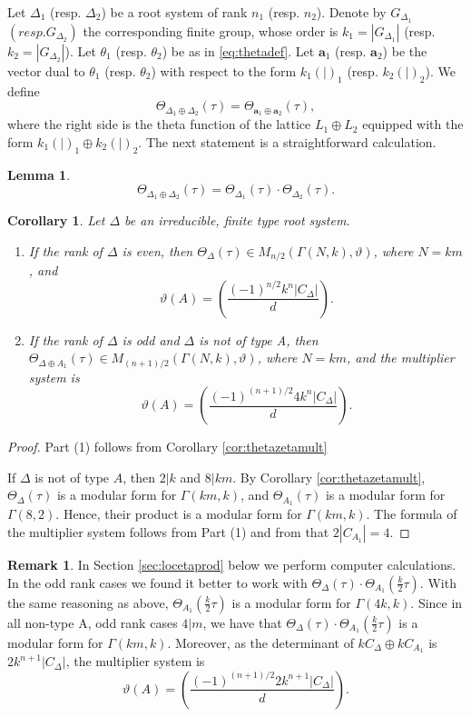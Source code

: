 \documentclass[11pt,a4paper]{amsart}
\newtheorem{lemma}[theorem]{Lemma}
\newtheorem{corollary}[theorem]{Corollary}
\theoremstyle{definition}
\newtheorem{remark}[theorem]{Remark}
\begin{document}
 
 Let $\Delta_1$ (resp. $\Delta_2$) be a root system of rank $n_1$ (resp. $n_2$). Denote by $G_{\Delta_1}$ $(resp. G_{\Delta_2})$ the corresponding finite group, whose order is $k_1=|G_{\Delta_1}|$ (resp. $k_2=|G_{\Delta_2}|$). Let 
$\theta_1$ (resp. $\theta_2$) be as in \eqref{eq:thetadef}.
 Let
 $\mathbf{a}_1$ (resp.  $\mathbf{a}_2$) be the vector dual to $\theta_1$ (resp. $\theta_2$) with respect to the form
 $k_1(|)_1$ (resp. $k_2(|)_2$). We define
 \[ \Theta_{\Delta_1 \oplus \Delta_2}(\tau)=\Theta_{\mathbf{a}_1 \oplus \mathbf{a}_2}(\tau),\]
where the right side is the theta function of the lattice $L_1 \oplus L_2$ equipped with the form $k_1(|)_1 \oplus k_2(|)_2$. The next statement is a straightforward calculation.

\begin{lemma}
\[ \Theta_{\Delta_1 \oplus \Delta_2}(\tau)=\Theta_{\Delta_1}(\tau)\cdot \Theta_{\Delta_2}(\tau).\]
\end{lemma}
 
\begin{corollary} Let $\Delta$ be an irreducible, finite type root system.
\begin{enumerate}
	\item If the rank of $\Delta$ is even, then $\Theta_{\Delta}(\tau) \in M_{n/2}(\Gamma(N,k), \vartheta)$, where $N=km$, and 
	\[ \vartheta(A)= \left( \frac{(-1)^{n/2} k^n |C_{\Delta}|}{d} \right). \]
	\item If the rank of $\Delta$ is odd and $\Delta$ is not of type A, then $\Theta_{\Delta\oplus A_1}(\tau) \in M_{(n+1)/2}(\Gamma(N,k), \vartheta)$, where $N=km$, and 
	the multiplier system is
	\[ \vartheta(A)= \left( \frac{(-1)^{(n+1)/2} 4k^n|C_{\Delta}|}{d} \right). \]
	\end{enumerate}
\end{corollary}
\begin{proof} Part (1) follows from Corollary \ref{cor:thetazetamult} 
	
	If $\Delta$ is not of type $A$, then $2|k$ and $8|km$. By Corollary \ref{cor:thetazetamult}, $\Theta_{\Delta}(\tau) $ is a modular form for $\Gamma(km,k)$, and  $\Theta_{A_1}(\tau)$ is a modular form for $\Gamma(8,2)$. Hence, their product is a modular form for $\Gamma(km,k)$. The formula of the multiplier system follows from Part (1) and from that $2|C_{A_1}|=4$.
\end{proof}

\begin{remark}
In Section \ref{sec:locetaprod} below we perform computer calculations. In the odd rank cases we found it better to work with $\Theta_{\Delta}(\tau)\cdot \Theta_{A_1}(\frac{k}{2}\tau)$. With the same reasoning as above, $\Theta_{A_1}(\frac{k}{2}\tau)$ is a modular form for $\Gamma(4k,k)$. Since in all non-type A, odd rank cases $4|m$, we have that $\Theta_{\Delta}(\tau)\cdot \Theta_{A_1}(\frac{k}{2}\tau)$ is a modular form for $\Gamma(km,k)$. Moreover, as the determinant of $kC_{\Delta} \oplus k C_{A_1}$ is $2k^{n+1}|C_{\Delta}|$, the multiplier system is
\[ \vartheta(A)= \left( \frac{(-1)^{(n+1)/2} 2k^{n+1}|C_{\Delta}|}{d} \right). \]
\end{remark}
\end{document}
